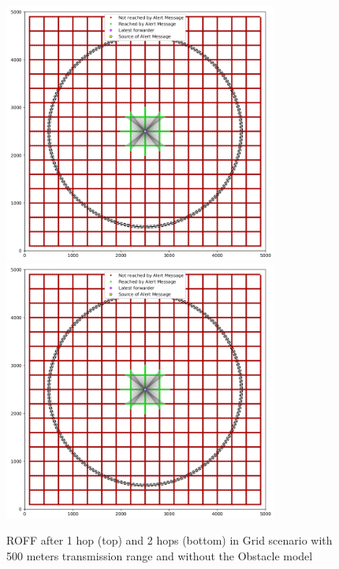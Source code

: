 		\begin{figure}[H]
			\centering
			\includegraphics[width=0.8\textwidth]{immagini/grid-300/b0/fb-1hop}
			\includegraphics[width=0.8\textwidth]{immagini/grid-300/b0/fb-1hop}
			\caption{ROFF after 1 hop (top) and 2 hops (bottom) in Grid scenario with 500 meters transmission range and without the Obstacle model}
			\label{fig:roff-b0-grid-transmission} %
		\end{figure}
	
